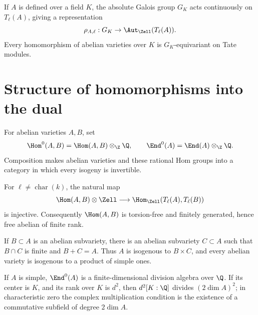 \begin{proposition}
\label{mumford-prop-galois-tate-action}
If $A$ is defined over a field $K$, the absolute Galois group $G_K$ acts
continuously on $T_\ell(A)$, giving a representation
\[
 \rho_{A,\ell}:G_K\to\Aut_{\Zell}(T_\ell(A)).
\]
Every homomorphism of abelian varieties over $K$ is $G_K$-equivariant on Tate
modules.
\notready
\end{proposition}

\section[Structure of Hom(X, dual X)]{Structure of homomorphisms into the dual}
\label{mumford-IV19}

\begin{definition}
\label{mumford-def-hom-up-to-isogeny}
For abelian varieties $A,B$, set
\[
 \Hom^0(A,B)=\Hom(A,B)\otimes_\Z\Q,\qquad
 \End^0(A)=\End(A)\otimes_\Z\Q.
\]
Composition makes abelian varieties and these rational Hom groups into a
category in which every isogeny is invertible.
\notready
\end{definition}

\begin{theorem}
\label{mumford-thm-hom-tate-injective}
For $\ell\ne\operatorname{char}(k)$, the natural map
\[
 \Hom(A,B)\otimes\Zell\longrightarrow
 \Hom_{\Zell}(T_\ell(A),T_\ell(B))
\]
is injective.  Consequently $\Hom(A,B)$ is torsion-free and finitely
generated, hence free abelian of finite rank.
\notready
\end{theorem}

\begin{theorem}
\label{mumford-thm-poincare-complete-reducibility}
If $B\subset A$ is an abelian subvariety, there is an abelian subvariety
$C\subset A$ such that $B\cap C$ is finite and $B+C=A$.  Thus $A$ is isogenous
to $B\times C$, and every abelian variety is isogenous to a product of simple
ones.
\notready
\end{theorem}

\begin{corollary}
\label{mumford-cor-simple-endomorphism-algebra}
If $A$ is simple, $\End^0(A)$ is a finite-dimensional division algebra over
$\Q$.  If its center is $K$, and its rank over $K$ is $d^2$, then
$d^2[K:\Q]$ divides $(2\dim A)^2$; in characteristic zero the complex
multiplication condition is the existence of a commutative subfield of degree
$2\dim A$.
\notready
\end{corollary}


